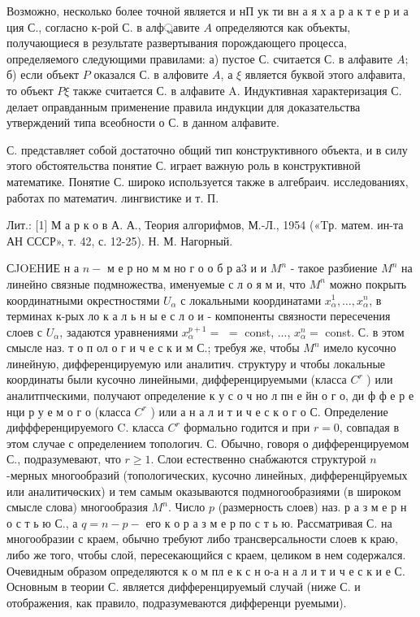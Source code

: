 \documentclass[10pt]{article}
\begin{document}
Возможно, несколько более точной является и нП ук ти вн а я х а р а к т е р и а ция С., согласно к-рой С. в алф্রавите $A$ определяются как объекты, получающиеся в результате развертывания порождающего процесса, определяемого следующими правилами: а) пустое С. считается С. в алфавите $A$; б) если объект $P$ оказался С. в алфовите $A$, а $\xi$ является буквой этого алфавита, то объект $P \xi$ также считается С. в алфавите A. Индуктивная характеризация С. делает оправданным применение правила индукции для доказательства утверждений типа всеобности о С. в данном алфавите.



С. представляет собой достаточно общий тип конструктивного объекта, и в силу этого обстоятельства понятие С. играет важную роль в конструктивной математике. Понятие С. широко используется также в алгебраич. исследованиях, работах по математич. лингвистике и т. П.



Лит.: [1] М а р к о в А. А., Теория алгорифмов, М.-Л., 1954 («Tр. матем. ин-та АН СССР», т. 42, с. 12-25). Н. М. Нагорный.



СJOEHИЕ н а $n-$ м е р но м м но г о о б р а3 и и $M^{n}$ - такое разбиение $M^{n}$ на линейно связные подмножества, именуемые с л о я м и, что $M^{n}$ можно покрыть координатными окрестностями $U_{\alpha}$ с локальными координатами $x_{\alpha}^{1}, \ldots, x_{\alpha}^{n}$, в терминах к-рых ло к а л ь н ы е с л о и - компоненты связности пересечения слоев с $U_{\alpha}$, задаются уравнениями $x_{\alpha}^{p+1}=$ $=$ const, ..., $x_{\alpha}^{n}=$ const. С. в этом смысле наз. т о п ол о г и ч е с к и м С.; требуя же, чтобы $M^{n}$ имело кусочно линейную, дифференцируемую или аналитич. структуру и чтобы локальные координаты были кусочно линейными, дифференцируемыми (класса $C^{r}$ ) или аналитпческими, получают определение к у с о ч но л пн е йн о г о, ди ф ф е р е нци р у е м о г о (класса $C^{r}$ ) или а н а л и т и ч е с к о г о С. Определение диффференцируемого $\mathrm{C}$. класса $C^{r}$ формально годится и при $r=0$, совпадая в этом случае с определением топологич. С. Обычно, говоря о дифференцируемом С., подразумевают, что $r \geqslant 1$. Слои естественно снабжаются структурой $n$-мерных многообразий (топологических, кусочно линейных, дифференцйруемых или аналитичөских) и тем самым оказываются подмногообразиями (в широком смысле слова) многообразия $M^{n}$. Число $p$ (размерность слоев) наз. р а з м е р н о с т ь ю С., а $q=n-p-$ его к о р а з м е р по с т ь ю. Рассматривая С. на многообразии с краем, обычно требуют либо трансверсальности слоев к краю, либо же того, чтобы слой, пересекающийся с краем, целиком в нем содержался. Очевидным образом определяются к о м пл е к с н о-а н а л и т и ч е с к и е С. Основным в теории С. является дифференцируемый случай (ниже С. и отображения, как правило, подразумеваются дифференци руемыми).
\end{document}
